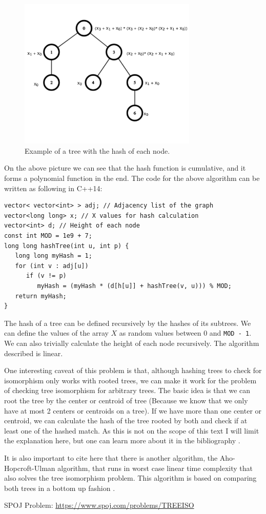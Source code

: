 \begin{figure}[h!]
  \centering
  \includegraphics[width=8.5cm]{figuras/treeIsomorphism.png}
  \caption{Example of a tree with the hash of each node. }
\end{figure}


On the above picture we can see that the hash function is cumulative, and it forms a polynomial function in the end. The code for the above algorithm can be written as following in C++14:

\begin{lstlisting}
vector< vector<int> > adj; // Adjacency list of the graph
vector<long long> x; // X values for hash calculation
vector<int> d; // Height of each node
const int MOD = 1e9 + 7;
long long hashTree(int u, int p) {
   long long myHash = 1;
   for (int v : adj[u])
      if (v != p)
         myHash = (myHash * (d[h[u]] + hashTree(v, u))) % MOD;
   return myHash;
}
\end{lstlisting}

The hash of a tree can be defined recursively by the hashes of its subtrees. We can define the values of the array \( X \) as random values between \( 0 \) and \texttt{MOD - 1}. We can also trivially calculate the height of each node recursively. The algorithm described is linear.

One interesting caveat of this problem is that, although hashing trees to check for isomorphism only works with rooted trees, we can make it work for the problem of checking tree isomorphism for arbitrary trees. The basic idea is that we can root the tree by the center or centroid of tree (Because we know that we only have at most 2 centers or centroids on a tree). If we have more than one center or centroid, we can calculate the hash of the tree rooted by both and check if at least one of the hashed match. As this is not on the scope of this text I will limit the explanation here, but one can learn more about it in the bibliography \citep{Centroid}.

It is also important to cite here that there is another algorithm, the Aho-Hopcroft-Ulman algorithm, that runs in worst case linear time complexity that also solves the tree isomorphism problem. This algorithm is based on comparing both trees in a bottom up fashion \cite{AHU}.

SPOJ Problem: \url{https://www.spoj.com/problems/TREEISO}

